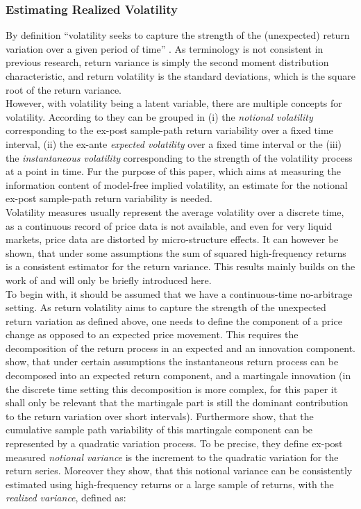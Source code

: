 \subsubsection{Estimating Realized Volatility}\label{sec:221RV}
By definition ``volatility seeks to capture the strength of the (unexpected) return variation over a given period of time'' \parencite[p.7]{andersen2001}. As terminology is not consistent in previous research, return variance is simply the second moment distribution characteristic, and return volatility is the standard deviations, which is the square root of the return variance. \\
However, with volatility being a latent variable, there are multiple concepts for volatility. According to \citeauthor{andersen2001} they can be grouped in (i) the \emph{notional volatility} corresponding to the ex-post sample-path return variability over a fixed time interval, (ii) the ex-ante \emph{expected volatility} over a fixed time interval or the (iii) the \emph{instantaneous volatility} corresponding to the strength of the volatility process at a point in time. Fur the purpose of this paper, which aims at measuring the information content of model-free implied volatility, an estimate for the  notional ex-post sample-path return variability is needed. \\
Volatility measures usually represent the average volatility over a discrete time, as a continuous record of price data is not available, and even for very liquid markets, price data are distorted by micro-structure effects. It can however be shown, that under some assumptions the sum of squared high-frequency returns is a consistent estimator for the return variance. This results mainly builds on the work of \parencite{andersen2001} and will only be briefly introduced here.\\
%
To begin with, it should be assumed that we have a continuous-time no-arbitrage setting. As return volatility aims to capture the strength of the unexpected return variation as defined above, one needs to define the component of a price change as opposed to an expected price movement. This requires the decomposition of the return process in an expected and an innovation component. \textcite{andersen2001} show, that under certain assumptions the instantaneous return process can be decomposed into an expected return component, and a martingale innovation (in the discrete time setting this decomposition is more complex, for this paper it shall only be relevant that the martingale part is still the dominant contribution to the return variation over short intervals). Furthermore \textcite{andersen2001} show, that the cumulative sample path variability of this martingale component can be represented by a quadratic variation process. To be precise, they define ex-post measured \emph{notional variance} is the increment to the quadratic variation for the return series. Moreover they show, that this notional variance can be consistently estimated using high-frequency returns or a large sample of returns, with the \emph{realized variance}, defined as:
